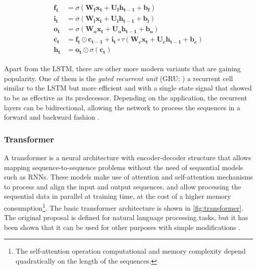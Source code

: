 \begin{align}
\label{eq:LSTM}
\begin{split}
	\mathbf{f_t} &= \sigma(\mathbf{W_f} \mathbf{x_t} + \mathbf{U_f} \mathbf{h_{t-1}} + \mathbf{b_f})\\
	\mathbf{i_t} &= \sigma(\mathbf{W_i} \mathbf{x_t} + \mathbf{U_i} \mathbf{h_{t-1}} + \mathbf{b_i})\\
	\mathbf{o_t} &= \sigma(\mathbf{W_o} \mathbf{x_t} + \mathbf{U_o} \mathbf{h_{t-1}} + \mathbf{b_o})\\
	\mathbf{c_t} &= \mathbf{f_t} \odot \mathbf{c_{t-1}} + \mathbf{i_t} \circ \tau (\mathbf{W_c} \mathbf{x_t} + \mathbf{U_c} \mathbf{h_{t-1}} + \mathbf{b_c})\\
	\mathbf{h_t} &= \mathbf{o_t} \odot \sigma(\mathbf{c_t})
\end{split}
\end{align}

Apart from the LSTM, there are other more modern variants that are gaining popularity. One of them is the \textit{gated recurrent unit} (GRU; \citealp{chung2014}) a recurrent cell similar to the LSTM but more efficient and with a single state signal that showed to be as effective as its predecessor. Depending on the application, the recurrent layers can be bidirectional, allowing the network to process the sequences in a forward and backward fashion \autocite{schuster1997}.

\subsubsection{Transformer} \label{sec:transformer}
A transformer \autocite{vaswani2017} is a neural architecture with encoder-decoder structure that allows mapping sequence-to-sequence \autocite{sutskever2014} problems without the need of sequential models such as RNNs. These models make use of attention and self-attention mechanisms \autocite{bahdanau2015} to process and align the input and output sequences, and allow processing the sequential data in parallel at training time, at the cost of a higher memory consumption\footnote{The self-attention operation computational and memory complexity depend quadratically on the length of the sequences.}. The basic transformer  architecture is shown in \ref{fig:transformer}. The original proposal is defined for natural language processing tasks, but it has been shown that it can be used for other purposes with simple modifications \autocite{naihan2019, jiarui2021, sanyuan2021}.


